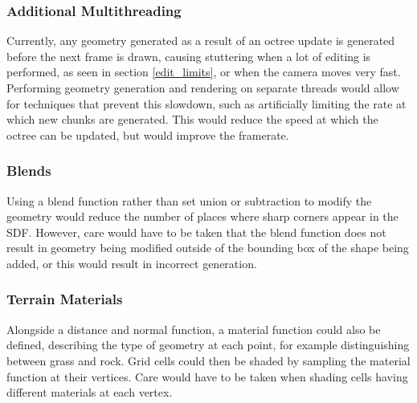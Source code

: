 \documentclass[11pt]{article}
\begin{document}
\subsubsection{Additional Multithreading}
Currently, any geometry generated as a result of an octree update is generated before the next frame is drawn, causing stuttering when a lot of editing is performed, as seen in section \ref{edit_limits}, or when the camera moves very fast. Performing geometry generation and rendering on separate threads would allow for techniques that prevent this slowdown, such as artificially limiting the rate at which new chunks are generated. This would reduce the speed at which the octree can be updated, but would improve the framerate.
\subsubsection{Blends}
Using a blend function rather than set union or subtraction to modify the geometry would reduce the number of places where sharp corners appear in the SDF. However, care would have to be taken that the blend function does not result in geometry being modified outside of the bounding box of the shape being added, or this would result in incorrect generation.
\subsubsection{Terrain Materials}
Alongside a distance and normal function, a material function could also be defined, describing the type of geometry at each point, for example distinguishing between grass and rock. Grid cells could then be shaded by sampling the material function at their vertices. Care would have to be taken when shading cells having different materials at each vertex.


\end{document}
